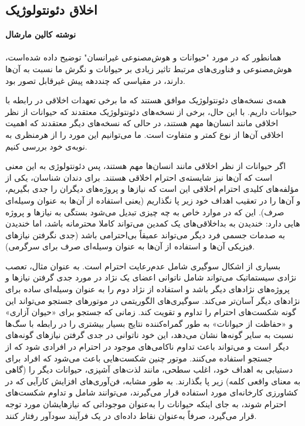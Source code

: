 {
\subsection*{اخلاق دئونتولوژیک}
\label{subsec:اخلاق دئونتولوژیک}
\noindent \textbf{نوشته کالین مارشال}
\\\\
همانطور که در مورد "حیوانات و هوش‌مصنوعی غیرانسان" توضیح داده شده‌است، هوش‌مصنوعی و فناوری‌های مرتبط تاثیر زیادی بر حیوانات و نگرش ما نسبت به آن‌ها دارند، در مقیاسی که چند‌دهه پیش غیرقابل تصور بود.
}

همه‌ی نسخه‌های دئونتولوژیک موافق هستند که ما برخی تعهدات اخلاقی در رابطه با حیوانات داریم.
با این حال، برخی از نسخه‌های دئونتولوژیک معتقدند که حیوانات از نظر اخلاقی مانند انسان‌ها مهم هستند، در حالی که نسخه‌های دیگر معتقدند که اهمیت اخلاقی آن‌ها از نوع کمتر و متفاوت است.
ما می‌توانیم این مورد را از هرمنظری به نوبه‌ی خود بررسی کنیم.

اگر حیوانات از نظر اخلاقی مانند انسان‌ها مهم هستند، پس دئونتولوژی به این معنی است که آن‌ها نیز شایسته‌ی احترام اخلاقی هستند.
برای دندان شناسان، یکی از مؤلفه‌های کلیدی احترام اخلاقی این است که نیازها و پروژه‌های دیگران را جدی بگیریم، و آن‌ها را در تعقیب اهداف خود زیر پا نگذاریم (یعنی استفاده از آن‌ها به عنوان وسیله‌ای صرف).
این که در موارد خاص به چه چیزی تبدیل می‌شود بستگی به نیازها و پروژه هایی دارد: خندیدن به بداخلاقی‌های یک کمدین می‌تواند کاملا محترمانه باشد، اما خندیدن به صدمات جسمی فرد دیگر می‌تواند عمیقاً بی‌احترامی باشد (جدی نگرفتن نیازهای فیزیکی آن‌ها و استفاده از آن‌ها به عنوان وسیله‌ای صرف برای سرگرمی).

بسیاری از اشکال سوگیری شامل عدم‌رعایت احترام است.
به عنوان مثال، تعصب نژادی سیستماتیک می‌تواند شامل ناتوانی اعضای یک نژاد در مورد جدی گرفتن نیازها و پروژه‌های نژادهای دیگر باشد و استفاده از نژاد دوم را به عنوان وسیله‌ای ساده برای نژادهای دیگر آسان‌تر می‌کند.
سوگیری‌های الگوریتمی در موتورهای جستجو می‌تواند این گونه شکست‌های احترام را تداوم و تقویت کند.
زمانی که جستجو برای «حیوان آزاری» و «حفاظت از حیوانات» به طور گمراه‌کننده نتایج بسیار بیشتری را در رابطه با سگ‌ها نسبت به سایر گونه‌ها نشان می‌دهد، این خود ناتوانی در جدی گرفتن نیازهای گونه‌های دیگر است و می‌تواند باعث تداوم ناکامی‌های موجود در احترام در افرادی شود که از جستجو استفاده می‌کنند.
موتور چنین شکست‌هایی باعث می‌شود که افراد برای دستیابی به اهداف خود، اغلب سطحی، مانند لذت‌های آشپزی، حیوانات دیگر را (گاهی به معنای واقعی کلمه) زیر پا بگذارند.
به طور مشابه، فن‌آوری‌های افزایش کارآیی که در کشاورزی کارخانه‌ای مورد استفاده قرار می‌گیرند، می‌توانند شامل و تداوم شکست‌های احترام شوند، به جای اینکه حیوانات را به‌عنوان موجوداتی که نیازهایشان مورد توجه قرار می‌گیرد، صرفاً به‌عنوان نقاط داده‌ای در یک فرآیند سودآور رفتار کنند.

